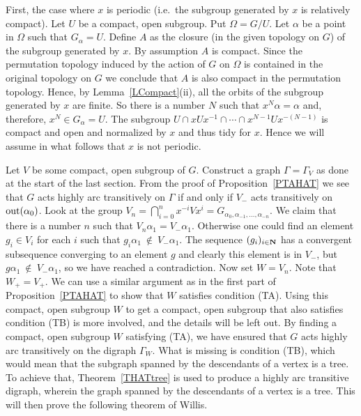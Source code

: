 \documentclass{emsprocart}
\theoremstyle{definition}
\begin{document}
First, the case where $x$ is periodic (i.e.~the subgroup generated
by $x$ is relatively compact).  Let $U$ be a compact, open
subgroup.  Put $\Omega=G/U$. Let $\alpha$ be a point in $\Omega$ such
that $G_\alpha=U$.   Define $A$ as the closure (in the given topology
on $G$)  of the subgroup generated by $x$.  By assumption $A$ is
compact.  Since the permutation topology induced by the action of $G$
on $\Omega$ is contained in the original topology on $G$ we conclude
that $A$ is also compact in the permutation topology.  Hence,
by Lemma~\ref{LCompact}(ii), all the
orbits of the subgroup generated
by $x$ are finite.  So there is a number $N$ such that
$x^N\alpha=\alpha$ and, therefore,  $x^N\in G_\alpha=U$.
The subgroup $U\cap xUx^{-1}\cap \cdots\cap x^{N-1}Ux^{-(N-1)}$ is compact and
open and normalized by $x$ and thus tidy for $x$.  Hence we will
assume in what follows that $x$ is not periodic.

Let $V$ be some compact, open subgroup of $G$.  Construct a graph
$\Gamma=\Gamma_V$ as done at the start of the last section.  From the proof of
Proposition~\ref{PTAHAT} we see that $G$ acts highly arc transitively
on $\Gamma$ if and only if $V_-$ acts transitively on ${\mbox{${\rm out}$}}(\alpha_0)$.
Look at the group $V_n=\bigcap_{i=0}^{n}x^{-i}Vx^i=G_{\alpha_0,
  \alpha_{-1},\ldots, \alpha_{-n}}$.  We claim that there is a number $n$
 such that $V_n\alpha_1=V_-\alpha_1$.  Otherwise one could find an
element $g_i\in V_i$ for each $i$ such that
$g_i\alpha_1{\mbox{$\ \not\in\ $}} V_-\alpha_1$.  The
sequence $(g_i)_{i\in{\bf N}}$
has a convergent subsequence converging to an element
$g$ and clearly this element is in $V_-$, but $g\alpha_1{\mbox{$\ \not\in\ $}}
V_-\alpha_1$, so we have reached a contradiction.  Now set $W=V_n$.
Note that $W_+=V_+$.  We can use a similar argument as
in the first part of Proposition~\ref{PTAHAT} to show that $W$
satisfies condition (TA).   Using this compact, open subgroup $W$ to get
a compact, open subgroup that also satisfies condition (TB) is more
involved, and the details will be left out.  By finding a compact, open
subgroup $W$ satisfying (TA),
we have ensured that $G$ acts highly arc transitively on the digraph
$\Gamma_W$.  What is missing is condition (TB), which would mean that the
subgraph spanned by the descendants of a vertex is a tree.  To achieve
that, Theorem~\ref{THATtree} is used to produce a highly arc
transitive digraph, wherein the graph spanned by the descendants of a
vertex is a tree.  This will then prove the following theorem of Willis.
\end{document}
